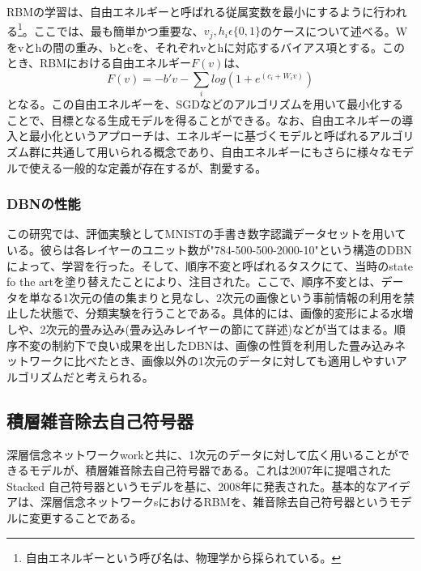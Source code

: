 RBMの学習は、自由エネルギーと呼ばれる従属変数を最小にするように行われる\footnote{自由エネルギーという呼び名は、物理学から採られている。}。ここでは、最も簡単かつ重要な、$v_j, h_i\epsilon\{0,1\}$のケースについて述べる。Wをvとhの間の重み、bとcを、それぞれvとhに対応するバイアス項とする。このとき、RBMにおける自由エネルギー$F(v)$は、
\begin{equation}
F(v) = -b' v-\sum_{i}log(1+e^{(c_i+W_{i}v)})
\end{equation}
となる。この自由エネルギーを、SGDなどのアルゴリズムを用いて最小化することで、目標となる生成モデルを得ることができる。なお、自由エネルギーの導入と最小化というアプローチは、エネルギーに基づくモデルと呼ばれるアルゴリズム群に共通して用いられる概念であり、自由エネルギーにもさらに様々なモデルで使える一般的な定義が存在するが、割愛する。
\subsubsection{DBNの性能}
この研究では、評価実験としてMNISTの手書き数字認識データセットを用いている。彼らは各レイヤーのユニット数が"784-500-500-2000-10"という構造のDBNによって、学習を行った。そして、順序不変と呼ばれるタスクにて、当時のstate fo the artを塗り替えたことにより、注目された。ここで、順序不変とは、データを単なる1次元の値の集まりと見なし、2次元の画像という事前情報の利用を禁止した状態で、分類実験を行うことである。具体的には、画像的変形による水増しや、2次元的畳み込み(畳み込みレイヤーの節にて詳述)などが当てはまる。順序不変の制約下で良い成果を出したDBNは、画像の性質を利用した畳み込みネットワークに比べたとき、画像以外の1次元のデータに対しても適用しやすいアルゴリズムだと考えられる。

\subsection{積層雑音除去自己符号器}
深層信念ネットワークworkと共に、1次元のデータに対して広く用いることができるモデルが、積層雑音除去自己符号器である。これは2007年に提唱されたStacked 自己符号器\cite{bengio2007greedy}というモデルを基に、2008年に発表された\cite{VincentPLarochelleH2008}。基本的なアイデアは、深層信念ネットワークsにおけるRBMを、雑音除去自己符号器というモデルに変更することである。
